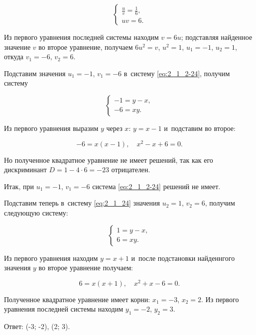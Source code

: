 \begin{equation*}
\begin{cases}
\displaystyle \frac{u}{v} = \frac{1}{6}, \\[10pt]
uv = 6.
\end{cases}
\end{equation*}

Из первого уравнения последней системы находим $v = 6u$;
подставляя найденное значение $v$ во второе уравнение,
получаем $6u^{2} = v$, $u^{2} = 1$, $u_{1} = -1$, $u_{2} = 1$,
откуда $v_{1} = -6$, $v_{2} = 6$.

Подставим значения $u_{1} = -1$, $v_{1} = -6$ в~систему \eqref{eq:2_1_2-24},
получим систему

\begin{equation*}
\begin{cases}
-1 = y - x, \\
-6 = xy.
\end{cases}
\end{equation*}

Из первого уравнения выразим $y$ через $x$: $y = x - 1$ и~подставим во второе:

\begin{equation*}
-6 = x(x - 1), \quad
x^{2} - x + 6 = 0.
\end{equation*}

Но полученное квадратное уравнение не имеет решений, так как его дискриминант
$D = 1 -4 \cdot 6 = -23$ отрицателен.

Итак, при $u_{1} = -1$, $v_{1} = -6$ система \eqref{eq:2_1_2-24} решений не имеет.

Подставим теперь в~систему \eqref{eq:2_1_24} значения $u_{2} = 1$, $v_{2} = 6$,
получим следующую систему:

\begin{equation*}
\begin{cases}
1 = y - x, \\
6 = xy.
\end{cases}
\end{equation*}

Из первого уравнения находим $y = x + 1$ и~после подстановки найденнгого значения
$y$ во второе уравнение получаем:

\begin{equation*}
6 = x(x + 1), \quad
x^{2} + x - 6 = 0.
\end{equation*}

Полученное квадратное уравнение имеет корни: $x_{1} = -3$, $x_{2} = 2$.
Из первого уравнения последней системы находим $y_{1} = -2$, $y_{2} = 3$.

Ответ: (-3; -2), (2; 3).
